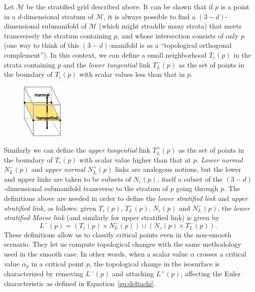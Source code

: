Let $\mathcal{M}$ be the stratified grid described above.  It can be
shown that if $p$ is a point in a $d$-dimensional stratum of
$\mathcal{M}$, it is always possible to find a $(3-d)$-dimensional
submanifold of $\mathcal{M}$ (which might straddle many strata) that
meets transversely the stratum containing $p$, and whose intersection
consists of only $p$ (one way to think of this $(3-d)$-manifold is as a ``topological orthogonal
complement'').  In this context, we can define a small neighborhood
$T_\varepsilon(p)$ in the strata containing $p$ and the \emph{lower
  tangential} link $T_L^-(p)$ as the set of points in the boundary of
$T_\varepsilon(p)$ with scalar values less than that in $p$.
\begin{figure}
\centering
\includegraphics[width=2.0cm,keepaspectratio=true]{chapter3/figures/ilustration.png}
\end{figure}
Similarly we can define the \emph{upper tangential} link $T_L^+(p)$ as
the set of points in the boundary of $T_\varepsilon(p)$ with scalar
value higher than that at $p$.  \emph{Lower normal} $N_L^-(p)$ and
\emph{upper normal} $N_L^+(p)$ links are analogous notions, but the
lower and upper links are taken to be subsets of $N_\varepsilon(p)$,
itself a subset of the $(3-d)$-dimensional submanifold transverse to
the stratum of $p$ going through $p$.  The definitions above are needed
in order to define the \emph{lower stratified link} and \emph{upper
  stratified link}, as follows: given $T_\varepsilon(p),\,
T_L^-(p),\,N_\varepsilon(p)$ and $N_L^-(p)$, the \emph{lower
  stratified Morse link} (and similarly for upper stratified link) is
given by
\begin{equation}
L^-(p) = (T_\varepsilon(p) \times N_L^-(p)) \cup (N_\varepsilon(p)
\times T_L^-(p)) \label{eq:lowerstratifiedlink}.
\end{equation}
These definitions allow us to classify critical points even in the non-smooth scenario.
They let us compute topological changes with
the same methodology used in the smooth case. In other words, when a
scalar value $\alpha$ crosses a critical value $\alpha_p$ in a
critical point $p$, the topological change in the isosurface is
characterized by removing $L^-(p)$ and attaching $L^+(p)$, affecting
the Euler characteristic as defined in Equation~\ref{eq:deltachi}.%

